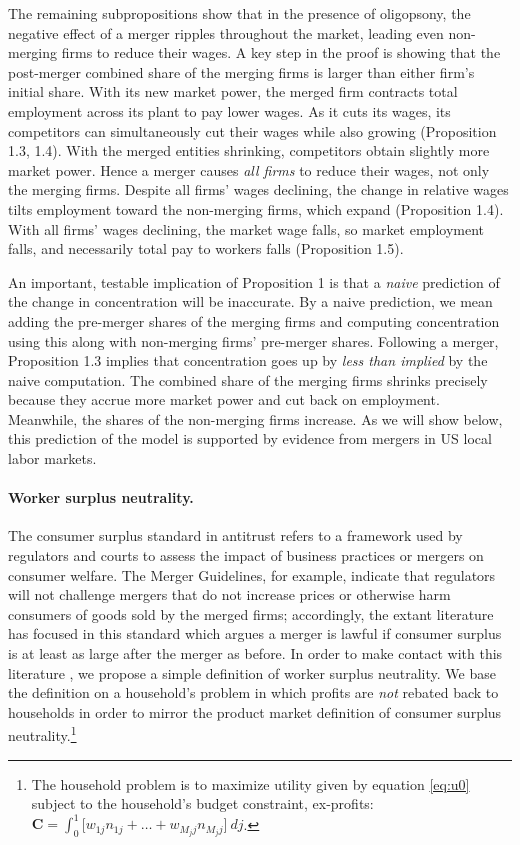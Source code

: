 \documentclass[12pt]{article}
\theoremstyle{prop}
\begin{document}
The remaining subpropositions show that in the presence of oligopsony, the negative effect of a merger ripples throughout the market, leading even non-merging firms to reduce their wages. 
A key step in the proof is showing that the post-merger combined share of the merging firms is larger than either firm's initial share. 
With its new market power, the merged firm contracts total employment across its plant to pay lower wages. 
As it cuts its wages, its competitors can simultaneously cut their wages while also growing (Proposition 1.3, 1.4). 
With the merged entities shrinking, competitors obtain slightly more market power. 
Hence a merger causes \emph{all firms} to reduce their wages, not only the merging firms. 
Despite all firms' wages declining, the change in relative wages tilts employment toward the non-merging firms, which expand (Proposition 1.4). 
With all firms' wages declining, the market wage falls, so market employment falls, and necessarily total pay to workers falls (Proposition 1.5). 

An important, testable implication of Proposition 1 is that a \emph{naive} prediction of the change in concentration will be inaccurate. 
By a naive prediction, we mean adding the pre-merger shares of the merging firms and computing concentration using this along with non-merging firms' pre-merger shares. 
Following a merger, Proposition 1.3 implies that concentration goes up by \emph{less than implied} by the naive computation.
The combined share of the merging firms shrinks precisely because they accrue more market power and cut back on employment.
Meanwhile, the shares of the non-merging firms increase. 
As we will show below, this prediction of the model is supported by evidence from mergers in US local labor markets. 

\paragraph{Worker surplus neutrality.}
The consumer surplus standard in antitrust refers to a framework used by regulators and courts to assess the impact of business practices or mergers on consumer welfare. The Merger Guidelines, for example, indicate that regulators will not challenge mergers that do not increase prices or otherwise harm consumers of goods sold by the merged firms; accordingly, the extant literature has focused in this standard which argues a merger is lawful if consumer surplus is at least as large after the merger as before. In order to make contact with this literature \citep[e.g.~see][]{werden1996robust,pittman2007consumer,farrell2010antitrust,nocke2022concentration}, we propose a simple definition of worker surplus neutrality.  
We base the definition on a household's problem in which profits are \textit{not} rebated back to households in order to mirror the product market definition of consumer surplus neutrality.\footnote{
    The household problem  is to maximize utility given by equation \eqref{eq:u0} subject to the household's budget constraint, ex-profits: $	\mathbf{C} =\int_0^1 \Big[w_{1j}n_{1j}+\dots + w_{M_{j}j}n_{M_{j}j}\Big]\:dj $.}
 
\end{document}
